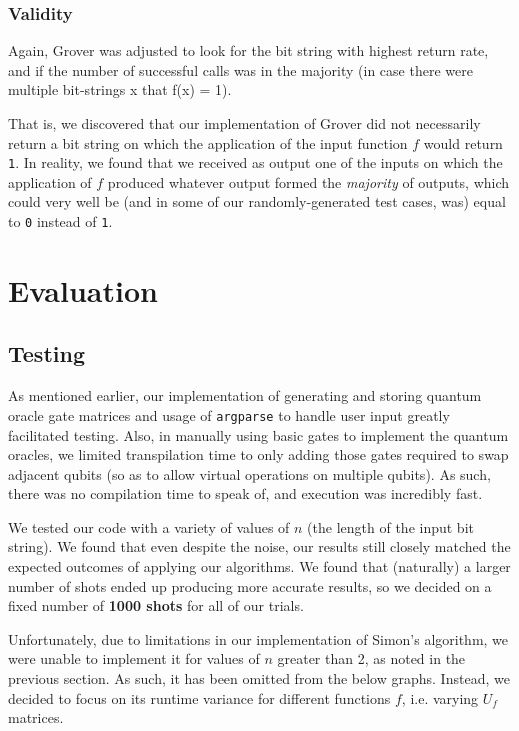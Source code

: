 \documentclass[12pt]{article}
\begin{document}
\subsubsection*{Validity}
Again, Grover was adjusted to look for the bit string with highest return rate, and if the number of successful calls was in the majority (in case there were multiple bit-strings x that f(x) = 1).

That is, we discovered that our implementation of Grover did not necessarily return a bit string on which the application of the input function $f$ would return \texttt{1}.
In reality, we found that we received as output one of the inputs on which the application of $f$ produced whatever output formed the \textit{majority} of outputs, which could very well be (and in some of our randomly-generated test cases, was) equal to \texttt{0} instead of \texttt{1}.

\section{Evaluation}

\subsection{Testing}

As mentioned earlier, our implementation of generating and storing quantum oracle gate matrices and usage of \texttt{argparse} to handle user input greatly facilitated testing.
Also, in manually using basic gates to implement the quantum oracles, we limited transpilation time to only adding those gates required to swap adjacent qubits (so as to allow virtual operations on multiple qubits).
As such, there was no compilation time to speak of, and execution was incredibly fast.

We tested our code with a variety of values of $n$ (the length of the input bit string).
We found that even despite the noise, our results still closely matched the expected outcomes of applying our algorithms.
We found that (naturally) a larger number of shots ended up producing more accurate results, so we decided on a fixed number of \textbf{1000 shots} for all of our trials.

Unfortunately, due to limitations in our implementation of Simon's algorithm, we were unable to implement it for values of $n$ greater than 2, as noted in the previous section.
As such, it has been omitted from the below graphs.
Instead, we decided to focus on its runtime variance for different functions $f$, i.e. varying $U_f$ matrices.
\end{document}
